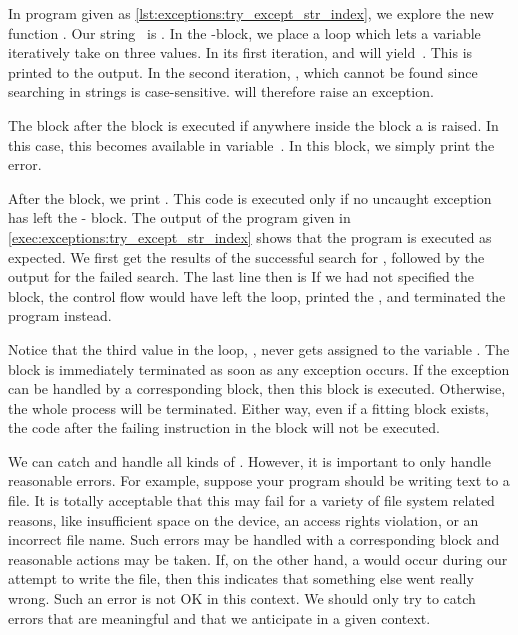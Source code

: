 In program  given as \cref{lst:exceptions:try_except_str_index}, we explore the new function .
Our string~ is .
In the -block, we place a  loop which lets a variable~ iteratively take on three values.
In its first iteration,  and  will yield~.
This is printed to the output.
In the second iteration, , which cannot be found since searching in strings is case-sensitive.
 will therefore raise an exception.

The  block after the  block is executed if anywhere inside the  block a  is raised.
In this case, this  becomes available in variable~.
In this block, we simply print the error.

After the block, we print .
This code is executed only if no uncaught exception has left the - block.
The output of the program given in \cref{exec:exceptions:try_except_str_index} shows that the program is executed as expected.
We first get the results of the successful search for , followed by the output for the failed search.
The last line then is 
If we had not specified the  block, the control flow would have left the loop, printed the , and terminated the program instead.

Notice that the third value in the loop, , never gets assigned to the variable .
The  block is immediately terminated as soon as any exception occurs.
If the exception can be handled by a corresponding  block, then this block is executed.
Otherwise, the whole process will be terminated.
Either way, even if a fitting  block exists, the code after the failing instruction in the  block will not be executed.

We can catch and handle all kinds of .
However, it is important to only handle reasonable errors.
For example, suppose your program should be writing text to a file.
It is totally acceptable that this may fail for a variety of file system related reasons, like insufficient space on the device, an access rights violation, or an incorrect file name.
Such errors may be handled with a corresponding  block and reasonable actions may be taken.
If, on the other hand, a  would occur during our attempt to write the file, then this indicates that something else went really wrong.
Such an error is not OK in this context.
We should only try to catch errors that are meaningful and that we anticipate in a given context.

